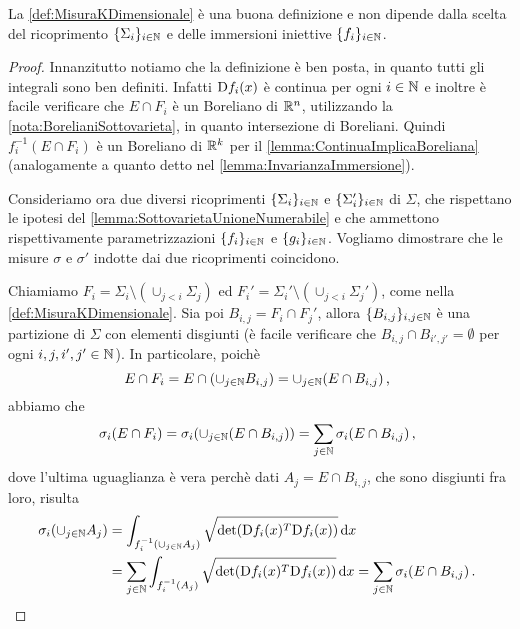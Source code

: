 \begin{remark}\label{nota:DefMisuraKDimBuona}
	La \cref{def:MisuraKDimensionale} è una buona definizione e non dipende dalla scelta del ricoprimento $\{\Sigma_i\}_{i\in\mathbb N}$ e delle immersioni iniettive $\{f_i\}_{i\in\mathbb N}$.
\end{remark}
\begin{proof}
	Innanzitutto notiamo che la definizione è ben posta, in quanto tutti gli integrali sono ben definiti. Infatti $\mathrm D f_i(x)$ è continua per ogni $i\in\mathbb N$ e inoltre è facile verificare che $E\cap F_i$ è un Boreliano di $\mathbb R^n$, utilizzando la \cref{nota:BorelianiSottovarieta}, in quanto intersezione di Boreliani. Quindi $f_i^{-1}(E\cap F_i)$ è un Boreliano di $\mathbb R^k$ per il \cref{lemma:ContinuaImplicaBoreliana} (analogamente a quanto detto nel \cref{lemma:InvarianzaImmersione}).

	Consideriamo ora due diversi ricoprimenti $\{\Sigma_i\}_{i\in\mathbb N}$ e $\{\Sigma_i'\}_{i\in\mathbb N}$ di $\Sigma$, che rispettano le ipotesi del \cref{lemma:SottovarietaUnioneNumerabile} e che ammettono rispettivamente parametrizzazioni $\{f_i\}_{i\in\mathbb N}$ e $\{g_i\}_{i\in\mathbb N}$. Vogliamo dimostrare che le misure $\sigma$ e $\sigma'$ indotte dai due ricoprimenti coincidono.
	
	Chiamiamo $F_i=\Sigma_i\setminus (\cup_{j<i}\Sigma_j)$ ed $F_i'=\Sigma_i'\setminus (\cup_{j<i}\Sigma_j')$, come nella \cref{def:MisuraKDimensionale}. Sia poi $B_{i,j}=F_i \cap F_j'$, allora $\{B_{i,j}\}_{i,j\in\mathbb N}$ è una partizione di $\Sigma$ con elementi disgiunti (è facile verificare che $B_{i,j}\cap B_{i',j'}=\emptyset$ per ogni $i,j,i',j'\in\mathbb N$). In particolare, poichè
	\begin{equation*}
		E\cap F_i=E\cap (\cup_{j\in\mathbb N}B_{i,j})=\cup_{j\in\mathbb N}(E\cap B_{i,j})\, \text{, }
	\end{equation*}
	abbiamo che
	\begin{equation*}
		\sigma_i(E\cap F_i)=\sigma_i(\cup_{j\in\mathbb N}(E\cap B_{i,j}))=\sum_{j\in\mathbb N}\sigma_i(E\cap B_{i,j})\, \text{, }
	\end{equation*}
	dove l'ultima uguaglianza è vera perchè dati $A_j=E\cap B_{i,j}$, che sono disgiunti fra loro, risulta
	\begin{align*}
		\sigma_i(\cup_{j\in\mathbb N}A_j)& =\int_{f_i^{-1}(\cup_{j\in\mathbb N}A_j)}\sqrt{\det(\mathrm D f_i(x)^T\mathrm D f_i(x))} \,\mathrm d x\\
		&=\sum_{j\in\mathbb N}\int_{f_i^{-1}(A_j)}\sqrt{\det(\mathrm D f_i(x)^T\mathrm D f_i(x))} \,\mathrm d x=\sum_{j\in\mathbb N}\sigma_i(E\cap B_{i,j})\, \text{. }
	\end{align*}
	

\end{proof}
